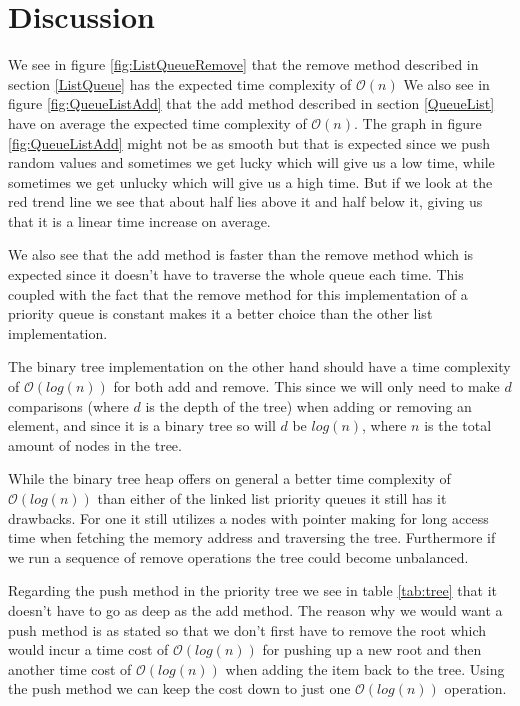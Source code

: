 \documentclass[a4paper,11pt]{article}
\begin{document}
\section{Discussion}

We see in figure \ref{fig:ListQueueRemove} that the remove method described in section \ref{ListQueue} has the 
expected time complexity of $\mathcal{O}(n)$ We also see in figure \ref{fig:QueueListAdd} that the add method 
described in section \ref{QueueList} have on average the expected time complexity of $\mathcal{O}(n)$. The graph 
in figure \ref{fig:QueueListAdd} might not be as smooth but that is expected since we push random values and 
sometimes we get lucky which will give us a low time, while sometimes we get unlucky which will give us a high
time. But if we look at the red trend line we see that about half lies above it and half below it, giving us that
it is a linear time increase on average. 

We also see that the add method is faster than the remove method which is expected since it doesn't have to 
traverse the whole queue each time. This coupled with the fact that the remove method for this implementation 
of a priority queue is constant makes it a better choice than the other list implementation.

The binary tree implementation on the other hand should have a time complexity of $\mathcal{O}(log(n))$ for 
both add and remove. This since we will only need to make $d$ comparisons (where $d$ is the depth of the tree) 
when adding or removing an element, and since it is a binary tree so will $d$ be $log(n)$, where $n$ is the total 
amount of nodes in the tree. 

While the binary tree heap offers on general a better time complexity of $\mathcal{O}(log(n))$ than either of 
the linked list priority queues it still has it drawbacks. For one it still utilizes a nodes with pointer making
for long access time when fetching the memory address and traversing the tree. Furthermore if we run a sequence of 
remove operations the tree could become unbalanced. 

Regarding the push method in the priority tree we see in table \ref{tab:tree} that it doesn't have to go as deep 
as the add method. The reason why we would want a push method is as stated so that we don't first have to remove
the root which would incur a time cost of $\mathcal{O}(log(n))$ for pushing up a new root and then another time 
cost of $\mathcal{O}(log(n))$ when adding the item back to the tree. Using the push method we can keep the cost down to 
just one $\mathcal{O}(log(n))$ operation.
\end{document}
